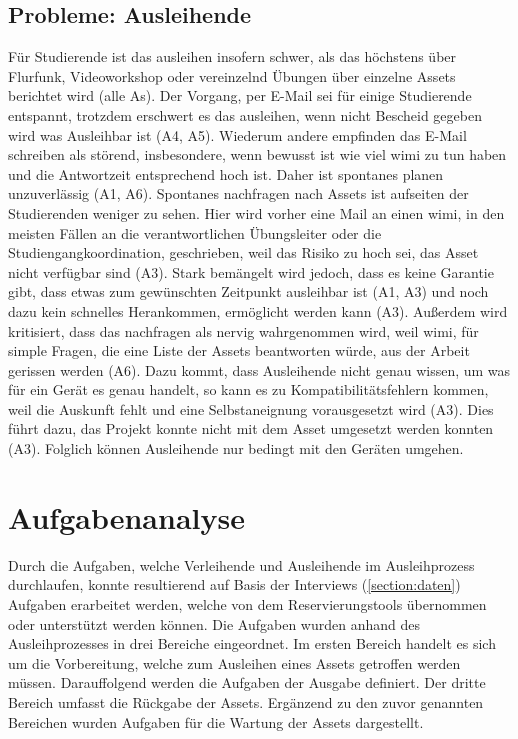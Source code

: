 \subsection{Probleme: Ausleihende}
Für Studierende ist das ausleihen insofern schwer, als das höchstens über Flurfunk, Videoworkshop
oder vereinzelnd Übungen über einzelne Assets berichtet wird (alle As). Der Vorgang, per E-Mail sei
für einige Studierende entspannt, trotzdem erschwert es das ausleihen, wenn nicht Bescheid gegeben
wird was Ausleihbar ist (A4, A5). Wiederum andere empfinden das E-Mail schreiben als störend,
insbesondere, wenn bewusst ist wie viel \ac{wimi} zu tun haben und die Antwortzeit entsprechend hoch
ist. Daher ist spontanes planen unzuverlässig (A1, A6). Spontanes nachfragen nach Assets ist
aufseiten der Studierenden weniger zu sehen. Hier wird vorher eine Mail an einen \ac{wimi}, in den
meisten Fällen an die verantwortlichen Übungsleiter oder die Studiengangkoordination, geschrieben,
weil das Risiko zu hoch sei, das Asset nicht verfügbar sind (A3). Stark bemängelt wird jedoch, dass
es keine Garantie gibt, dass etwas zum gewünschten Zeitpunkt ausleihbar ist (A1, A3) und noch dazu
kein schnelles Herankommen, ermöglicht werden kann (A3). Außerdem wird kritisiert, dass das
nachfragen als nervig wahrgenommen wird, weil \ac{wimi}, für simple Fragen, die eine Liste der
Assets beantworten würde, aus der Arbeit gerissen werden (A6). Dazu kommt, dass Ausleihende nicht
genau wissen, um was für ein Gerät es genau handelt, so kann es zu Kompatibilitätsfehlern kommen,
weil die Auskunft fehlt und eine Selbstaneignung vorausgesetzt wird (A3). Dies führt dazu, das
Projekt konnte nicht mit dem Asset umgesetzt werden konnten (A3). Folglich können Ausleihende nur
bedingt mit den Geräten umgehen.


\section{Aufgabenanalyse}
\label{section:aufgaben}
Durch die Aufgaben, welche Verleihende und Ausleihende im Ausleihprozess durchlaufen, konnte
resultierend auf Basis der Interviews (\ref{section:daten}) Aufgaben erarbeitet werden, welche von
dem Reservierungstools übernommen oder unterstützt werden können. Die Aufgaben wurden anhand des
Ausleihprozesses in drei Bereiche eingeordnet. Im ersten Bereich handelt es sich um die
Vorbereitung, welche zum Ausleihen eines Assets getroffen werden müssen. Darauffolgend werden die
Aufgaben der Ausgabe definiert. Der dritte Bereich umfasst die Rückgabe der Assets. Ergänzend zu den
zuvor genannten Bereichen wurden Aufgaben für die Wartung der Assets dargestellt.

